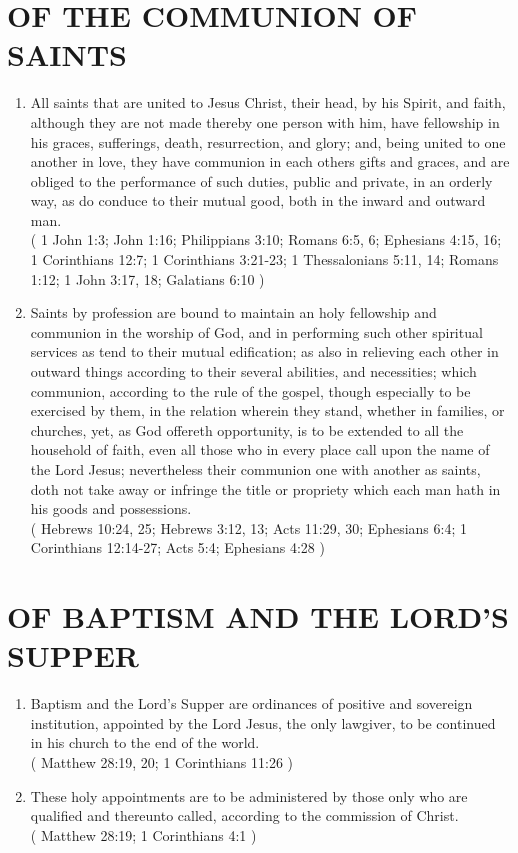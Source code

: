 \documentclass[12pt,a4paper]{book}
\begin{document}
\chapter{OF THE COMMUNION OF SAINTS}
\label{ch-com-sai}
\begin{enumerate}
\item
\label{ch-com-sai-1}
All saints that are united to Jesus Christ, their head, by his Spirit, and faith, although they are not made thereby one person with him, have fellowship in his graces, sufferings, death, resurrection, and glory; and, being united to one another in love, they have communion in each others gifts and graces, and are obliged to the performance of such duties, public and private, in an orderly way, as do conduce to their mutual good, both in the inward and outward man.\\
( 1 John 1:3; John 1:16; Philippians 3:10; Romans 6:5, 6; Ephesians 4:15, 16; 1 Corinthians 12:7; 1 Corinthians 3:21-23; 1 Thessalonians 5:11, 14; Romans 1:12; 1 John 3:17, 18; Galatians 6:10 )
\item
\label{ch-com-sai-2}
Saints by profession are bound to maintain an holy fellowship and communion in the worship of God, and in performing such other spiritual services as tend to their mutual edification; as also in relieving each other in outward things according to their several abilities, and necessities; which communion, according to the rule of the gospel, though especially to be exercised by them, in the relation wherein they stand, whether in families, or churches, yet, as God offereth opportunity, is to be extended to all the household of faith, even all those who in every place call upon the name of the Lord Jesus; nevertheless their communion one with another as saints, doth not take away or infringe the title or propriety which each man hath in his goods and possessions.\\
( Hebrews 10:24, 25; Hebrews 3:12, 13; Acts 11:29, 30; Ephesians 6:4; 1 Corinthians 12:14-27; Acts 5:4; Ephesians 4:28 )
\end{enumerate}

\chapter{OF BAPTISM AND THE LORD'S SUPPER}
\label{ch-ords}
\begin{enumerate}
\item
\label{ch-ords-1}
Baptism and the Lord's Supper are ordinances of positive and sovereign institution, appointed by the Lord Jesus, the only lawgiver, to be continued in his church to the end of the world.\\
( Matthew 28:19, 20; 1 Corinthians 11:26 )
\item
\label{ch-ords-2}
These holy appointments are to be administered by those only who are qualified and thereunto called, according to the commission of Christ.\\
( Matthew 28:19; 1 Corinthians 4:1 )
\end{enumerate}
\end{document}
